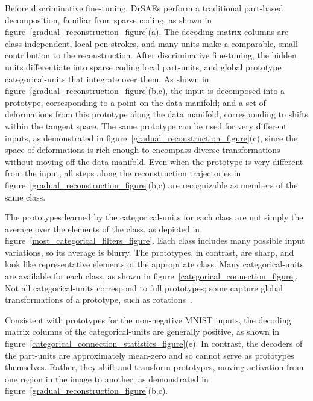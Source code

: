 \documentclass{article} %
\begin{document}
Before discriminative fine-tuning, DrSAEs perform a traditional part-based decomposition, familiar from sparse coding, as shown in figure~\ref{gradual_reconstruction_figure}(a).  The decoding matrix columns are class-independent, local pen strokes, and many units make a comparable, small contribution to the reconstruction.  After discriminative fine-tuning, the hidden units differentiate into sparse coding local part-units, and global prototype categorical-units that integrate %
over them.  As shown in figure~\ref{gradual_reconstruction_figure}(b,c), the input is decomposed into a prototype, corresponding to a point on the data manifold; and %
a set of deformations from this prototype along the data manifold, corresponding to shifts within the tangent space.  The same prototype can be used for very different inputs, as demonstrated in figure~\ref{gradual_reconstruction_figure}(c), since the space of deformations is rich enough to encompass diverse transformations without moving off the data manifold.  
Even when the prototype is very different from the input, all steps along the reconstruction trajectories in figure~\ref{gradual_reconstruction_figure}(b,c) are recognizable as members of the same class.

The prototypes learned by the categorical-units for each class are not simply the average over the elements of the class, as depicted in figure~\ref{most_categorical_filters_figure}.  Each class includes many possible input variations, so its average is blurry.  The prototypes, in contrast, are sharp, and look like representative elements of the appropriate class.  Many categorical-units are available for each class, as shown in figure~\ref{categorical_connection_figure}.  Not all categorical-units correspond to full prototypes; some capture global transformations of a prototype, such as rotations~\citep{simard1998}.  


Consistent with prototypes for the non-negative MNIST inputs, the decoding matrix columns of the categorical-units are generally positive, as shown in figure~\ref{categorical_connection_statistics_figure}(e).  In contrast, the decoders of the part-units are approximately mean-zero and so cannot serve as prototypes themselves.  Rather, they shift and transform prototypes, moving activation from one region in the image to another, as demonstrated in figure~\ref{gradual_reconstruction_figure}(b,c).
\end{document}
